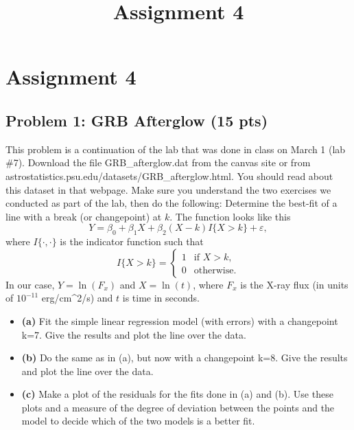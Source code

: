 \documentclass[11pt]{article}
\title{Assignment 4}
\providecommand{\tightlist}{%
      \setlength{\itemsep}{0pt}\setlength{\parskip}{0pt}}
\begin{document}
    
    
    \maketitle
    
    

    
    \hypertarget{assignment-4}{%
\section{Assignment 4}\label{assignment-4}}

    \hypertarget{problem-1-grb-afterglow-15-pts}{%
\subsection{Problem 1: GRB Afterglow (15
pts)}\label{problem-1-grb-afterglow-15-pts}}

This problem is a continuation of the lab that was done in class on
March 1 (lab \#7). Download the file GRB\_afterglow.dat from the canvas
site or from astrostatistics.psu.edu/datasets/GRB\_afterglow.html. You
should read about this dataset in that webpage. Make sure you understand
the two exercises we conducted as part of the lab, then do the
following: Determine the best-fit of a line with a break (or
changepoint) at \(k\). The function looks like this
\[Y = \beta_0 + \beta_1X + \beta_2(X - k)I\{X>k\} + \varepsilon,\] where
\(I\{\cdot,\cdot\}\) is the indicator function such that
\[I\{X>k\} = \begin{cases} 1 & \text{if $X > k$,} \\ 0 & \text{otherwise.} \end{cases}\]
In our case, \(Y = \ln(F_x)\) and \(X = \ln(t)\), where \(F_x\) is the
X-ray flux (in units of \(10^{-11}\) erg/cm\^{}2/s) and \(t\) is time in
seconds.

\begin{itemize}
\tightlist
\item
  \textbf{(a)} Fit the simple linear regression model (with errors) with
  a changepoint k=7. Give the results and plot the line over the data.
\item
  \textbf{(b)} Do the same as in (a), but now with a changepoint k=8.
  Give the results and plot the line over the data.
\item
  \textbf{(c)} Make a plot of the residuals for the fits done in (a) and
  (b). Use these plots and a measure of the degree of deviation between
  the points and the model to decide which of the two models is a better
  fit.
\end{itemize}
\end{document}
